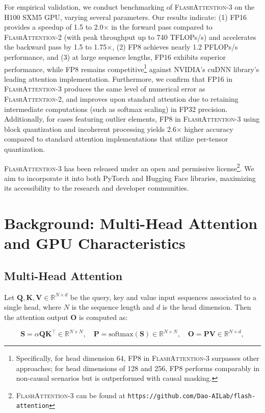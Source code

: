For empirical validation, we conduct benchmarking of \textsc{FlashAttention-3} on the H100 SXM5 GPU, varying several parameters. Our results indicate: (1) FP16 provides a speedup of 1.5 to 2.0$\times$ in the forward pass compared to \textsc{FlashAttention-2} (with peak throughput up to 740 TFLOPs/s) and accelerates the backward pass by 1.5 to 1.75$\times$, (2) FP8 achieves nearly 1.2 PFLOPs/s performance, and (3) at large sequence lengths, FP16 exhibits superior performance, while FP8 remains competitive\footnote{Specifically, for head dimension 64, FP8 in \textsc{FlashAttention-3} surpasses other approaches; for head dimensions of 128 and 256, FP8 performs comparably in non-causal scenarios but is outperformed with causal masking.} against NVIDIA's cuDNN library's leading attention implementation. Furthermore, we confirm that FP16 in \textsc{FlashAttention-3} produces the same level of numerical error as \textsc{FlashAttention-2}, and improves upon standard attention due to retaining intermediate computations (such as softmax scaling) in FP32 precision. Additionally, for cases featuring outlier elements, FP8 in \textsc{FlashAttention-3} using block quantization and incoherent processing yields 2.6$\times$ higher accuracy compared to standard attention implementations that utilize per-tensor quantization.

\textsc{FlashAttention-3} has been released under an open and permissive license\footnote{\textsc{FlashAttention-3} can be found at \texttt{https://github.com/Dao-AILab/flash-attention}}. We aim to incorporate it into both PyTorch and Hugging Face libraries, maximizing its accessibility to the research and developer communities.

\section{Background: Multi-Head Attention and GPU Characteristics}
\label{sec:background}

\subsection{Multi-Head Attention}
\label{subsec:multi_head_attn}

Let $\mathbf{Q}, \mathbf{K}, \mathbf{V} \in \mathbb{R}^{N \times d}$ be the query, key and value input sequences associated to a single head, where $N$ is the sequence length and $d$ is the head dimension. Then the attention output $\mathbf{O}$ is computed as:

\begin{equation*}
  \mathbf{S} = \alpha \mathbf{Q} \mathbf{K}^\top \in \mathbb{R}^{N \times N}, \quad \mathbf{P} = \mathrm{softmax}(\mathbf{S}) \in \mathbb{R}^{N \times N}, \quad \mathbf{O} = \mathbf{P}\mathbf{V} \in \mathbb{R}^{N \times d},
\end{equation*}

